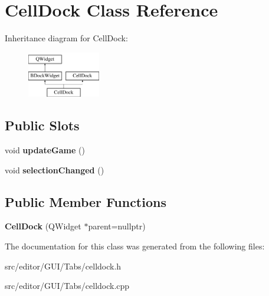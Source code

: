 \hypertarget{class_cell_dock}{\section{\-Cell\-Dock \-Class \-Reference}
\label{class_cell_dock}
}
\-Inheritance diagram for \-Cell\-Dock\-:\begin{figure}[H]
\begin{center}
\leavevmode
\includegraphics[height=2.000000cm]{class_cell_dock}
\end{center}
\end{figure}
\subsection*{\-Public \-Slots}
\begin{DoxyCompactItemize}
\item 
\hypertarget{class_cell_dock_ac33251ff749bac9ec9bc85ae84eefd78}{void {\bfseries update\-Game} ()}\label{class_cell_dock_ac33251ff749bac9ec9bc85ae84eefd78}

\item 
\hypertarget{class_cell_dock_aa00bce4b3adaaf6d481f836b2e1a4f53}{void {\bfseries selection\-Changed} ()}\label{class_cell_dock_aa00bce4b3adaaf6d481f836b2e1a4f53}

\end{DoxyCompactItemize}
\subsection*{\-Public \-Member \-Functions}
\begin{DoxyCompactItemize}
\item 
\hypertarget{class_cell_dock_a0f424371a3e858864fdbba4b23b6fce7}{{\bfseries \-Cell\-Dock} (\-Q\-Widget $\ast$parent=nullptr)}\label{class_cell_dock_a0f424371a3e858864fdbba4b23b6fce7}

\end{DoxyCompactItemize}


\-The documentation for this class was generated from the following files\-:\begin{DoxyCompactItemize}
\item 
src/editor/\-G\-U\-I/\-Tabs/celldock.\-h\item 
src/editor/\-G\-U\-I/\-Tabs/celldock.\-cpp\end{DoxyCompactItemize}
